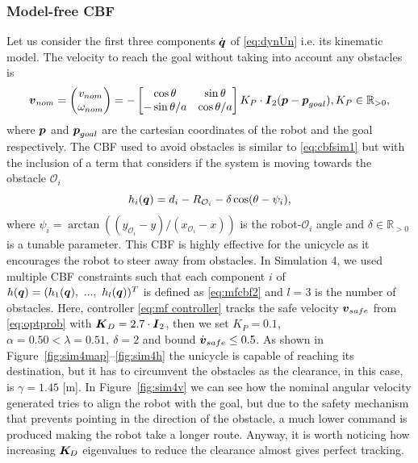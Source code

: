 \subsubsection{Model-free CBF}
Let us consider  the first three components $\dot{\boldsymbol{q}}$ of \eqref{eq:dynUn} i.e. its kinematic model. The velocity to reach the goal without taking into account any obstacles is
\begin{equation}\label{eq:qnominalu}
    \boldsymbol{v}_{nom}= \begin{pmatrix}v_{nom} \\ \omega_{nom} \end{pmatrix} = -\begin{bmatrix}\cos\theta & \sin \theta\\ -\sin \theta /a & \cos \theta/a \end{bmatrix} K_P\cdot\boldsymbol{I}_{2} (\boldsymbol{p}-\boldsymbol{p}_{goal}), K_P \in \mathbb{R}_{>0},
\end{equation}
where $\boldsymbol{p}$ and $\boldsymbol{p}_{goal}$ are the cartesian coordinates of the robot and the goal respectively.
The CBF used to avoid obstacles is similar to \eqref{eq:cbfsim1} but with the inclusion of a term that considers if the system is moving towards the obstacle $\mathcal{O}_i$
\begin{equation}\label{eq:mfcbf2}
    h_i({\boldsymbol{q}}) = d_i-R_{\mathcal{O}_i}-\delta \cos(\theta - \psi_i),
\end{equation}
where $\psi_i= \arctan((y_{\mathcal{O}_i}-y)/(x_{\mathcal{O}_i}-x))$ is the robot-$\mathcal{O}_i$ angle and $\delta \in \mathbb{R}_{>0}$ is a tunable parameter. This CBF is highly effective for the unicycle as it encourages the robot to steer away from obstacles. In Simulation 4, we used multiple CBF constraints such that each component $i$ of $h({\boldsymbol{q}}) = (h_1({\boldsymbol{q}}),~...,~h_{l}({\boldsymbol{q}}))^T$ is defined as \eqref{eq:mfcbf2} and $l=3$ is the number of obstacles. 
Here, controller \eqref{eq:mf controller} tracks the safe velocity $\boldsymbol{v}_{safe}$ from \eqref{eq:optprob} with $\boldsymbol{K}_D=2.7\cdot\boldsymbol{I}_{2}$, then we set $K_P=0.1$, $\alpha = 0.50<\lambda=0.51,~\delta=2$ and bound $\dot{\boldsymbol{v}}_{safe} \leq 0.5$. As shown in Figure~\ref{fig:sim4map}--\ref{fig:sim4h} the unicycle is capable of reaching its destination, but it has to circumvent the obstacles as the clearance, in this case, is $\gamma=1.45$ [m]. In Figure~\ref{fig:sim4v} we can see how the nominal angular velocity generated tries to align the robot with the goal, but due to the safety mechanism that prevents pointing in the direction of the obstacle, a much lower command is produced making the robot take a longer route. Anyway, it is worth noticing how increasing $\boldsymbol{K}_{\!D}$ eigenvalues to reduce the clearance almost gives perfect tracking.
